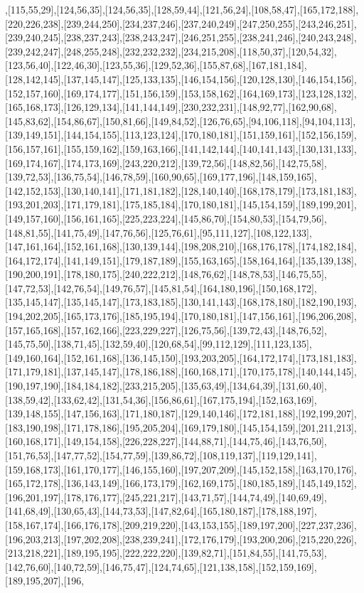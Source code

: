,[115,55,29],[124,56,35],[124,56,35],[128,59,44],[121,56,24],[108,58,47],[165,172,188],[220,226,238],[239,244,250],[234,237,246],[237,240,249],[247,250,255],[243,246,251],[239,240,245],[238,237,243],[238,243,247],[246,251,255],[238,241,246],[240,243,248],[239,242,247],[248,255,248],[232,232,232],[234,215,208],[118,50,37],[120,54,32],[123,56,40],[122,46,30],[123,55,36],[129,52,36],[155,87,68],[167,181,184],[128,142,145],[137,145,147],[125,133,135],[146,154,156],[120,128,130],[146,154,156],[152,157,160],[169,174,177],[151,156,159],[153,158,162],[164,169,173],[123,128,132],[165,168,173],[126,129,134],[141,144,149],[230,232,231],[148,92,77],[162,90,68],[145,83,62],[154,86,67],[150,81,66],[149,84,52],[126,76,65],[94,106,118],[94,104,113],[139,149,151],[144,154,155],[113,123,124],[170,180,181],[151,159,161],[152,156,159],[156,157,161],[155,159,162],[159,163,166],[141,142,144],[140,141,143],[130,131,133],[169,174,167],[174,173,169],[243,220,212],[139,72,56],[148,82,56],[142,75,58],[139,72,53],[136,75,54],[146,78,59],[160,90,65],[169,177,196],[148,159,165],[142,152,153],[130,140,141],[171,181,182],[128,140,140],[168,178,179],[173,181,183],[193,201,203],[171,179,181],[175,185,184],[170,180,181],[145,154,159],[189,199,201],[149,157,160],[156,161,165],[225,223,224],[145,86,70],[154,80,53],[154,79,56],[148,81,55],[141,75,49],[147,76,56],[125,76,61],[95,111,127],[108,122,133],[147,161,164],[152,161,168],[130,139,144],[198,208,210],[168,176,178],[174,182,184],[164,172,174],[141,149,151],[179,187,189],[155,163,165],[158,164,164],[135,139,138],[190,200,191],[178,180,175],[240,222,212],[148,76,62],[148,78,53],[146,75,55],[147,72,53],[142,76,54],[149,76,57],[145,81,54],[164,180,196],[150,168,172],[135,145,147],[135,145,147],[173,183,185],[130,141,143],[168,178,180],[182,190,193],[194,202,205],[165,173,176],[185,195,194],[170,180,181],[147,156,161],[196,206,208],[157,165,168],[157,162,166],[223,229,227],[126,75,56],[139,72,43],[148,76,52],[145,75,50],[138,71,45],[132,59,40],[120,68,54],[99,112,129],[111,123,135],[149,160,164],[152,161,168],[136,145,150],[193,203,205],[164,172,174],[173,181,183],[171,179,181],[137,145,147],[178,186,188],[160,168,171],[170,175,178],[140,144,145],[190,197,190],[184,184,182],[233,215,205],[135,63,49],[134,64,39],[131,60,40],[138,59,42],[133,62,42],[131,54,36],[156,86,61],[167,175,194],[152,163,169],[139,148,155],[147,156,163],[171,180,187],[129,140,146],[172,181,188],[192,199,207],[183,190,198],[171,178,186],[195,205,204],[169,179,180],[145,154,159],[201,211,213],[160,168,171],[149,154,158],[226,228,227],[144,88,71],[144,75,46],[143,76,50],[151,76,53],[147,77,52],[154,77,59],[139,86,72],[108,119,137],[119,129,141],[159,168,173],[161,170,177],[146,155,160],[197,207,209],[145,152,158],[163,170,176],[165,172,178],[136,143,149],[166,173,179],[162,169,175],[180,185,189],[145,149,152],[196,201,197],[178,176,177],[245,221,217],[143,71,57],[144,74,49],[140,69,49],[141,68,49],[130,65,43],[144,73,53],[147,82,64],[165,180,187],[178,188,197],[158,167,174],[166,176,178],[209,219,220],[143,153,155],[189,197,200],[227,237,236],[196,203,213],[197,202,208],[238,239,241],[172,176,179],[193,200,206],[215,220,226],[213,218,221],[189,195,195],[222,222,220],[139,82,71],[151,84,55],[141,75,53],[142,76,60],[140,72,59],[146,75,47],[124,74,65],[121,138,158],[152,159,169],[189,195,207],[196,